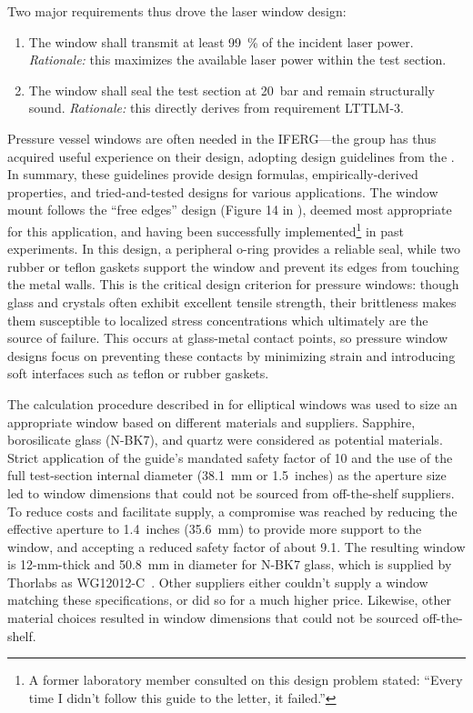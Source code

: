             Two major requirements thus drove the laser window design:
            \begin{enumerate}
                \item The window shall transmit at least 99~\% of the incident laser power. \emph{Rationale:} this maximizes the available laser power within the test section.
                \item The window shall seal the test section at 20~bar and remain structurally sound. \emph{Rationale:} this directly derives from requirement LTTLM-3.
            \end{enumerate}

            Pressure vessel windows are often needed in the IFERG---the group has thus acquired useful experience on their design, adopting design guidelines from the \textcite{brookhavennationallaboratoryGuideGlassPlastic2005}. In summary, these guidelines provide design formulas, empirically-derived properties, and tried-and-tested designs for various applications. The window mount follows the ``free edges'' design (Figure 14 in \cite{brookhavennationallaboratoryGuideGlassPlastic2005}), deemed most appropriate for this application, and having been successfully implemented\footnote{A former laboratory member consulted on this design problem stated: ``Every time I didn't follow this guide to the letter, it failed.''} in past experiments. In this design, a peripheral o-ring provides a reliable seal, while two rubber or teflon gaskets support the window and prevent its edges from touching the metal walls. This is the critical design criterion for pressure windows: though glass and crystals often exhibit excellent tensile strength, their brittleness makes them susceptible to localized stress concentrations which ultimately are the source of failure. This occurs at glass-metal contact points, so pressure window designs focus on preventing these contacts by minimizing strain and introducing soft interfaces such as teflon or rubber gaskets.

            The calculation procedure described in \cite{brookhavennationallaboratoryGuideGlassPlastic2005} for elliptical windows was used to size an appropriate window based on different materials and suppliers. Sapphire, borosilicate glass (N-BK7), and quartz were considered as potential materials. Strict application of the guide's mandated safety factor of 10 and the use of the full test-section internal diameter (\qty{38.1}{mm} or 1.5~inches) as the aperture size led to window dimensions that could not be sourced from off-the-shelf suppliers. To reduce costs and facilitate supply, a compromise was reached by reducing the effective aperture to 1.4~inches (\qty{35.6}{mm}) to provide more support to the window, and accepting a reduced safety factor of about 9.1. The resulting window is 12-mm-thick and \qty{50.8}{mm} in diameter for N-BK7 glass, which is supplied by Thorlabs as WG12012-C~\cite{thorlabsWG12012CO2NBK7}. Other suppliers either couldn't supply a window matching these specifications, or did so for a much higher price. Likewise, other material choices resulted in window dimensions that could not be sourced off-the-shelf.

